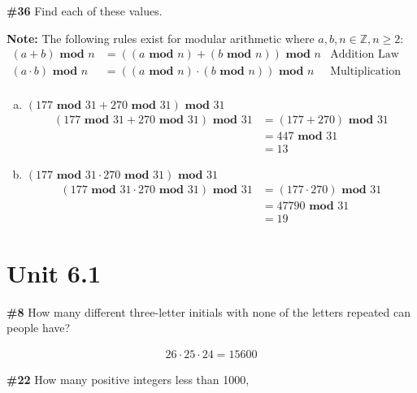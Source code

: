 \documentclass{article}
\newcommand{\unit}[1]{\section{Unit #1}}
\newcommand{\problem}[1]{\textbf{\##1}}
\newcommand{\prob}[1]{\problem{#1}}
\newcommand{\AllIntegers}{\mathbb{Z}}
\renewcommand{\mod}{\textbf{ mod }}
\begin{document}
\pagebreak
\prob{36}
Find each of these values.

\textbf{Note: } The following rules exist for modular arithmetic where \(a, b, n \in \AllIntegers, n \geq 2\):
\begin{align*}
    (a + b) \textbf{ mod } n &= ((a \textbf{ mod } n) + (b \textbf{ mod } n)) \textbf{ mod } n & \text{Addition Law}\\
    (a \cdot b) \textbf{ mod } n &= ((a \textbf{ mod } n) \cdot (b \textbf{ mod } n)) \textbf{ mod } n & \text{Multiplication Law}\\
\end{align*}

\begin{enumerate}[a)]
    \item \((177 \mod 31 + 270 \mod 31) \mod 31\)
    \begin{align*}
        (177 \mod 31 + 270 \mod 31) \mod 31 &= (177 + 270) \mod 31\\
        &= 447 \mod 31\\
        &= 13
    \end{align*}
    \item \((177 \mod 31 \cdot 270 \mod 31) \mod 31\)
    \begin{align*}
        (177 \mod 31 \cdot 270 \mod 31) \mod 31 &= (177 \cdot 270) \mod 31\\
        &= 47790 \mod 31\\
        &= 19
    \end{align*}
\end{enumerate}
\pagebreak
\unit{6.1}
\prob{8}
How many diﬀerent three-letter initials with none of the letters repeated can people have?

\begin{align*}
    26 \cdot 25 \cdot 24 = 15600
\end{align*}

\pagebreak

\prob{22}
How many positive integers less than 1000,
\end{document}

